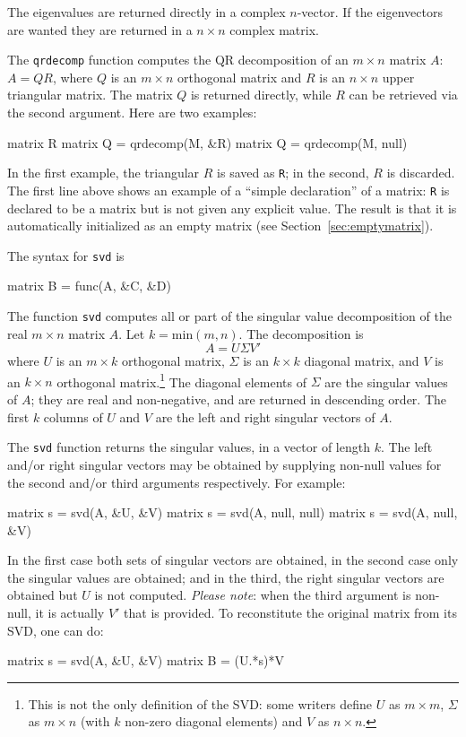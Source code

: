 The eigenvalues are returned directly in a complex $n$-vector. If the
eigenvectors are wanted they are returned in a $n \times n$ complex
matrix.

The \texttt{qrdecomp} function computes the QR decomposition of an $m
\times n$ matrix $A$: $A = QR$, where $Q$ is an $m \times n$
orthogonal matrix and $R$ is an $n \times n$ upper triangular matrix.
The matrix $Q$ is returned directly, while $R$ can be retrieved via
the second argument.  Here are two examples:
%
\begin{code}
matrix R
matrix Q = qrdecomp(M, &R)
matrix Q = qrdecomp(M, null)
\end{code}
%
In the first example, the triangular $R$ is saved as \texttt{R}; in
the second, $R$ is discarded.  The first line above shows an example
of a ``simple declaration'' of a matrix: \texttt{R} is declared to be
a matrix but is not given any explicit value. The result is that it is
automatically initialized as an empty matrix (see
Section~\ref{sec:emptymatrix}).

The syntax for \texttt{svd} is
%
\begin{code}
matrix B = func(A, &C, &D)
\end{code}
%
The function \texttt{svd} computes all or part of the singular value
decomposition of the real $m \times n$ matrix $A$. Let $k =
\mbox{min}(m, n)$.  The decomposition is
\[
A = U \Sigma V'
\]
where $U$ is an $m \times k$ orthogonal matrix, $\Sigma$ is an $k
\times k$ diagonal matrix, and $V$ is an $k \times n$ orthogonal
matrix.\footnote{This is not the only definition of the SVD: some
  writers define $U$ as $m \times m$, $\Sigma$ as $m \times n$ (with
  $k$ non-zero diagonal elements) and $V$ as $n \times n$.} The
diagonal elements of $\Sigma$ are the singular values of $A$; they are
real and non-negative, and are returned in descending order.  The
first $k$ columns of $U$ and $V$ are the left and right singular
vectors of $A$.

The \texttt{svd} function returns the singular values, in a vector of
length $k$.  The left and/or right singular vectors may be obtained by
supplying non-null values for the second and/or third arguments
respectively.  For example:
%
\begin{code}
matrix s = svd(A, &U, &V)
matrix s = svd(A, null, null)
matrix s = svd(A, null, &V)
\end{code}
%
In the first case both sets of singular vectors are obtained, in the
second case only the singular values are obtained; and in the third,
the right singular vectors are obtained but $U$ is not computed.
\emph{Please note}: when the third argument is non-null, it is
actually $V'$ that is provided.  To reconstitute the original matrix
from its SVD, one can do:
%
\begin{code}
matrix s = svd(A, &U, &V)
matrix B = (U.*s)*V
\end{code}
%

